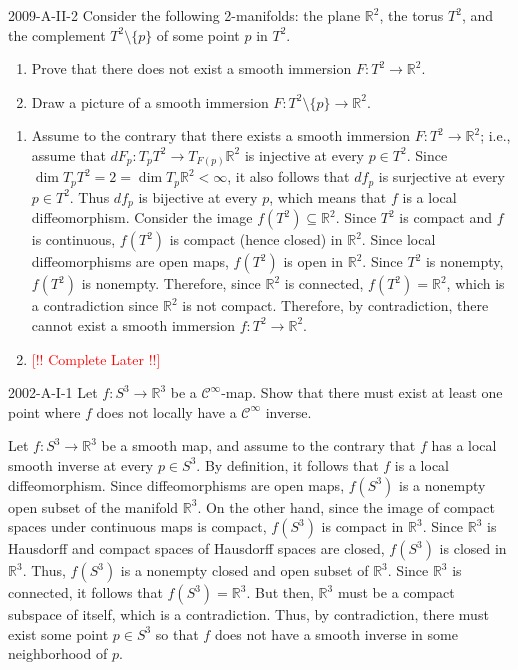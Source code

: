\documentclass{article}
\newcommand{\complete}{\textcolor{red}{[!! Complete Later !!]}}
\begin{document}
	\begin{prb}{2009-A-II-2}
		Consider the following 2-manifolds: the plane $\mathbb{R}^{2}$, the torus $T^{2}$, and the complement $T^{2}\setminus \{p\}$ of some point $p$ in $T^{2}$. \vspace{-0.25cm}
		\begin{enumerate}[itemsep =-2pt,label = (\alph{*})]
			\item Prove that there does not exist a smooth immersion $F: T^{2} \to \mathbb{R}^{2}$.
			\item Draw a picture of a smooth immersion $F: T^{2}\setminus \{p\} \to \mathbb{R}^{2}$. 
		\end{enumerate}
	\end{prb}
	\begin{enumerate}[itemsep =-2pt,label = (\alph{*})]
		\item Assume to the contrary that there exists a smooth immersion $F: T^{2} \to \mathbb{R}^{2}$; i.e., assume that $dF_{p}: T_{p}T^{2} \to T_{F(p)}\mathbb{R}^{2}$ is injective at every $p \in T^{2}$. Since $\dim{T_{p}T^{2}} = 2 = \dim{T_{p}\mathbb{R}^{2}} < \infty$, it also follows that $df_{p}$ is surjective at every $p \in T^{2}$. Thus $df_{p}$ is bijective at every $p$, which means that $f$ is a local diffeomorphism. Consider the image $f(T^{2}) \subseteq \mathbb{R}^{2}$. Since $T^{2}$ is compact and $f$ is continuous, $f(T^{2})$ is compact (hence closed) in $\mathbb{R}^{2}$. Since local diffeomorphisms are open maps, $f(T^{2})$ is open in $\mathbb{R}^{2}$. Since $T^{2}$ is nonempty, $f(T^{2})$ is nonempty. Therefore, since $\mathbb{R}^{2}$ is connected, $f(T^{2}) = \mathbb{R}^{2}$, which is a contradiction since $\mathbb{R}^{2}$ is not compact. Therefore, by contradiction, there cannot exist a smooth immersion $f: T^{2} \to \mathbb{R}^{2}$. 
		\item \complete 
	\end{enumerate}
	\begin{prb}{2002-A-I-1}
		Let $f: S^{3} \to \mathbb{R}^{3}$ be a $\mathcal{C}^{\infty}$-map. Show that there must exist at least one point where $f$ does not locally have a $\mathcal{C}^{\infty}$ inverse. 
	\end{prb}
	Let $f: S^{3} \to \mathbb{R}^{3}$ be a smooth map, and assume to the contrary that $f$ has a local smooth inverse at every $p \in S^{3}$. By definition, it follows that $f$ is a local diffeomorphism. Since diffeomorphisms are open maps, $f(S^{3})$ is a nonempty open subset of the manifold $\mathbb{R}^{3}$. On the other hand, since the image of compact spaces under continuous maps is compact, $f(S^{3})$ is compact in $\mathbb{R}^{3}$. Since $\mathbb{R}^{3}$ is Hausdorff and compact spaces of Hausdorff spaces are closed, $f(S^{3})$ is closed in $\mathbb{R}^{3}$. Thus, $f(S^{3})$ is a nonempty closed and open subset of $\mathbb{R}^{3}$. Since $\mathbb{R}^{3}$ is connected, it follows that $f(S^{3}) = \mathbb{R}^{3}$. But then, $\mathbb{R}^{3}$ must be a compact subspace of itself, which is a contradiction. Thus, by contradiction, there must exist some point $p \in S^{3}$ so that $f$ does not have a smooth inverse in some neighborhood of $p$. 
	
\end{document}
